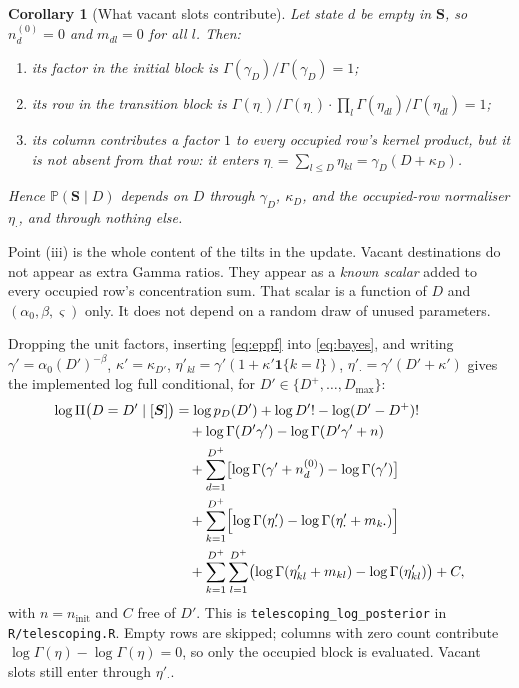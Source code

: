 \documentclass[11pt,a4paper]{article}
\newcommand{\bs}{\boldsymbol}
\newcommand{\Prb}{\mathbb{P}}
\newcommand{\Dplus}{D^{+}}
\newcommand{\Dmax}{D_{\max}}
\newcommand{\gammaD}{\gamma_{D}}
\newcommand{\kapD}{\kappa_{D}}
\newcommand{\etadot}{\eta_{\boldsymbol{\cdot}}}
\newcommand{\indic}[1]{\mathbf{1}\{#1\}}
\theoremstyle{plain}
\newtheorem{corollary}{Corollary}
\theoremstyle{definition}
\theoremstyle{remark}
\begin{document}
\begin{corollary}[What vacant slots contribute]
\label{cor:cancel}
Let state $d$ be empty in $\bs S$, so $n^{(0)}_d=0$ and $m_{dl}=0$ for all
$l$. Then:
\begin{enumerate}
\item its factor in the initial block is
$\Gamma(\gammaD)/\Gamma(\gammaD)=1$;
\item its \emph{row} in the transition block is
$\Gamma(\etadot)/\Gamma(\etadot)\cdot\prod_l\Gamma(\eta_{dl})/\Gamma(\eta_{dl})=1$;
\item its \emph{column} contributes a factor $1$ to every occupied row's
kernel product, but it is not absent from that row: it enters
$\etadot=\sum_{l\le D}\eta_{kl}=\gammaD(D+\kapD)$.
\end{enumerate}
Hence $\Prb(\bs S\mid D)$ depends on $D$ through $\gammaD$, $\kapD$, and
the occupied-row normaliser $\etadot$, and through nothing else.
\end{corollary}

Point (iii) is the whole content of the tilts in the update. Vacant
destinations do not appear as extra Gamma ratios. They appear as a
\emph{known scalar} added to every occupied row's concentration sum. That
scalar is a function of $D$ and $(\alpha_0,\beta,\varsigma)$ only. It does
not depend on a random draw of unused parameters.

Dropping the unit factors, inserting \eqref{eq:eppf} into \eqref{eq:bayes},
and writing $\gamma'=\alpha_0(D')^{-\beta}$,
$\kappa'=\kappa_{D'}$,
$\eta'_{kl}=\gamma'(1+\kappa'\indic{k=l})$,
$\eta'_{\boldsymbol{\cdot}}=\gamma'(D'+\kappa')$
gives the implemented log full conditional, for
$D'\in\{\Dplus,\dots,\Dmax\}$:
\begin{align}
\log\Pi\bigl(D=D'\mid[\bs S]\bigr)
&=
\log p_D(D')+\log D'!-\log(D'-\Dplus)!
\nonumber\\
&\quad
+\log\Gamma(D'\gamma')-\log\Gamma(D'\gamma'+n)
\nonumber\\
&\quad
+\sum_{d=1}^{\Dplus}\bigl[\log\Gamma(\gamma'+n^{(0)}_d)-\log\Gamma(\gamma')\bigr]
\nonumber\\
&\quad
+\sum_{k=1}^{\Dplus}\Bigl[
\log\Gamma(\eta'_{\boldsymbol{\cdot}})
-\log\Gamma(\eta'_{\boldsymbol{\cdot}}+m_{k\boldsymbol{\cdot}})
\Bigr]
\nonumber\\
&\quad
+\sum_{k=1}^{\Dplus}\sum_{l=1}^{\Dplus}
\bigl(\log\Gamma(\eta'_{kl}+m_{kl})-\log\Gamma(\eta'_{kl})\bigr)
+C,
\label{eq:telesc}
\end{align}
with $n=n_{\mathrm{init}}$ and $C$ free of $D'$. This is
\texttt{telescoping\_log\_posterior} in \texttt{R/telescoping.R}. Empty
rows are skipped; columns with zero count contribute
$\log\Gamma(\eta)-\log\Gamma(\eta)=0$, so only the occupied block is
evaluated. Vacant slots still enter through $\eta'_{\boldsymbol{\cdot}}$.
\end{document}
